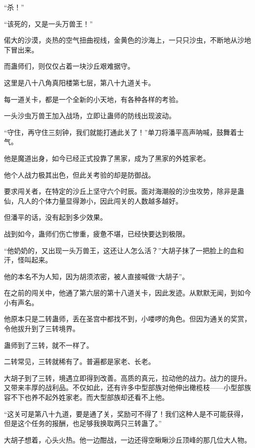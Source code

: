 
\begin{this_body}



“杀！”

“该死的，又是一头万兽王！”

偌大的沙漠，炎热的空气扭曲视线，金黄色的沙海上，一只只沙虫，不断地从沙地下冒出来。

而蛊师们，则仅仅占着一块沙丘艰难据守。

这里是八十八角真阳楼第七层，第八十九道关卡。

每一道关卡，都是一个全新的小天地，有各种各样的考验。

一头沙虫万兽王加入战场，立即让蛊师的防线出现波动。

“守住，再守住三刻钟，我们就能打通此关了！”单刀将潘平高声呐喊，鼓舞着士气。

他是魔道出身，如今已经正式投靠了黑家，成为了黑家的外姓家老。

他个人战力极其出色，但此关考验的却是防御战。

要求闯关者，在特定的沙丘上坚守六个时辰。面对海潮般的沙虫攻势，除非是蛊仙，凡人的个体力量显得渺小，因此闯关的人数越多越好。

但潘平的话，没有起到多少效果。

战到如今，蛊师们伤亡惨重，疲惫不堪，已经快要达到极限。

“他奶奶的，又出现一头万兽王，这还让人怎么活？”大胡子抹了一把脸上的血和汗，怪叫起来。

他的本名不为人知，因为胡须浓密，被人直接喊做“大胡子”。

在之前的闯关中，他通了第六层的第十八道关卡，因此发迹。从默默无闻，到如今小有声名。

他原本只是二转蛊师，丢在圣宫中都找不到，小喽啰的角色。但因为通关的奖赏，令他拔升到了三转境界。

蛊师到了三转，就不一样了。

二转常见，三转就稀有了。普遍都是家老、长老。

大胡子到了三转，境遇立即得到改善。高质的真元，拉动他的战力。战力的提升。又带来丰厚的战利品。不仅如此，还有许多中型部族对他伸出橄榄枝——小型部族容不下也养不起外姓家老。而大型部族却还看不上他。

“这关可是第八十九道，要是通了关，奖励可不得了！我们这种人是不可能获得，但是这个任务的报酬，也足够我换取两只三转蛊了。”

大胡子想着，心头火热。他一边酣战，一边还得空瞅瞅沙丘顶峰的那几位大人物。


\end{this_body}

